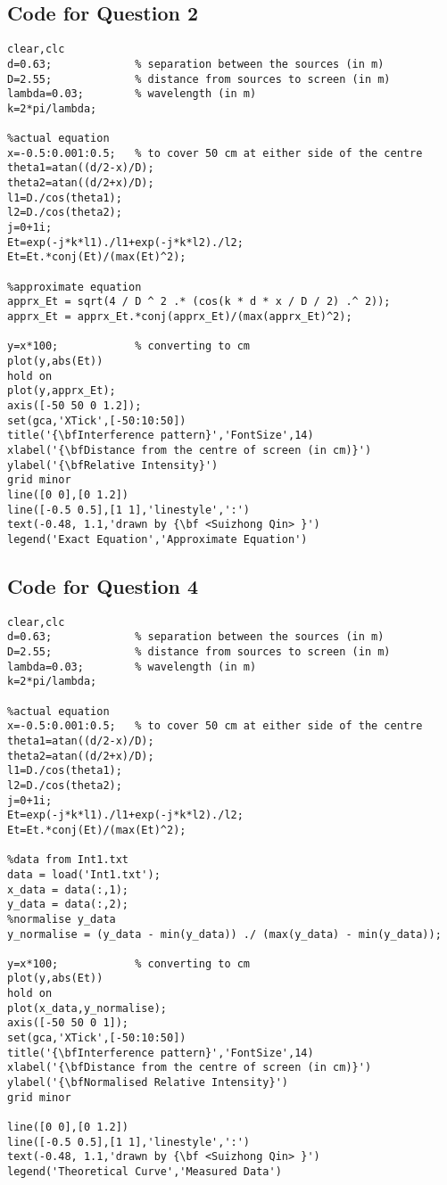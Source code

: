 \documentclass[12pt]{article}
\begin{document}
    \subsection{Code for Question 2}
    \begin{lstlisting}
clear,clc
d=0.63;             % separation between the sources (in m)
D=2.55;             % distance from sources to screen (in m)
lambda=0.03;        % wavelength (in m)
k=2*pi/lambda;

%actual equation
x=-0.5:0.001:0.5;   % to cover 50 cm at either side of the centre
theta1=atan((d/2-x)/D);
theta2=atan((d/2+x)/D);
l1=D./cos(theta1);
l2=D./cos(theta2);
j=0+1i;
Et=exp(-j*k*l1)./l1+exp(-j*k*l2)./l2;
Et=Et.*conj(Et)/(max(Et)^2);

%approximate equation
apprx_Et = sqrt(4 / D ^ 2 .* (cos(k * d * x / D / 2) .^ 2));
apprx_Et = apprx_Et.*conj(apprx_Et)/(max(apprx_Et)^2);

y=x*100;            % converting to cm
plot(y,abs(Et))
hold on
plot(y,apprx_Et);
axis([-50 50 0 1.2]);
set(gca,'XTick',[-50:10:50])
title('{\bfInterference pattern}','FontSize',14)
xlabel('{\bfDistance from the centre of screen (in cm)}')
ylabel('{\bfRelative Intensity}')
grid minor
line([0 0],[0 1.2])
line([-0.5 0.5],[1 1],'linestyle',':')
text(-0.48, 1.1,'drawn by {\bf <Suizhong Qin> }')
legend('Exact Equation','Approximate Equation')
    \end{lstlisting}
    \newpage
    \subsection{Code for Question 4}
    
    \begin{lstlisting}
clear,clc
d=0.63;             % separation between the sources (in m)
D=2.55;             % distance from sources to screen (in m)
lambda=0.03;        % wavelength (in m)
k=2*pi/lambda;

%actual equation
x=-0.5:0.001:0.5;   % to cover 50 cm at either side of the centre
theta1=atan((d/2-x)/D);
theta2=atan((d/2+x)/D);
l1=D./cos(theta1);
l2=D./cos(theta2);
j=0+1i;
Et=exp(-j*k*l1)./l1+exp(-j*k*l2)./l2;
Et=Et.*conj(Et)/(max(Et)^2);

%data from Int1.txt
data = load('Int1.txt');
x_data = data(:,1);
y_data = data(:,2);
%normalise y_data
y_normalise = (y_data - min(y_data)) ./ (max(y_data) - min(y_data));

y=x*100;            % converting to cm
plot(y,abs(Et))
hold on
plot(x_data,y_normalise);
axis([-50 50 0 1]);
set(gca,'XTick',[-50:10:50])
title('{\bfInterference pattern}','FontSize',14)
xlabel('{\bfDistance from the centre of screen (in cm)}')
ylabel('{\bfNormalised Relative Intensity}')
grid minor

line([0 0],[0 1.2])
line([-0.5 0.5],[1 1],'linestyle',':')
text(-0.48, 1.1,'drawn by {\bf <Suizhong Qin> }')
legend('Theoretical Curve','Measured Data')
    \end{lstlisting}
    
\end{document}
